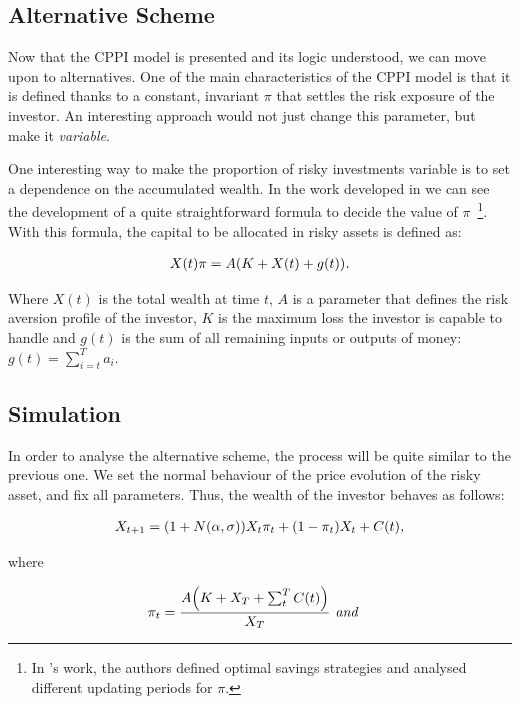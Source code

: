 \subsection{Alternative Scheme}

Now that the CPPI model is presented and its logic understood, we can move upon to alternatives. One of the main characteristics of the CPPI model is that it is defined thanks to a constant, invariant $\pi$ that settles the risk exposure of the investor. An interesting approach would not just change this parameter, but make it \emph{variable}.

One interesting way to make the proportion of risky investments variable is to set a dependence on the accumulated wealth. In the work developed in \cite{a:guillen-optimisation} we can see the development of a quite straightforward formula to decide the value of $\pi$~\footnote{In \cite{a:donnelly-savings-decisions}'s work, the authors defined optimal savings strategies and analysed different updating periods for $\pi$.}. With this formula, the capital to be allocated in risky assets is defined as:

\begin{align}
    X(t)\pi = A\qty(K + X(t) + g(t)) \textit{.}
\end{align}

Where $X(t)$ is the total wealth at time $t$, $A$ is a parameter that defines the risk aversion profile of the investor, $K$ is the maximum loss the investor is capable to handle and $g(t)$ is the sum of all remaining inputs or outputs of money: $g(t) = \sum_{i=t}^{T}a_i$.

\subsection*{Simulation}

In order to analyse the alternative scheme, the process will be quite similar to the previous one. We set the normal behaviour of the price evolution of the risky asset, and fix all parameters. Thus, the wealth of the investor behaves as follows:

\begin{align}
    X_{t+1} = \qty(1+N(\alpha, \sigma))X_t \pi_t + \qty(1 - \pi_t)X_t + C(t) \textit{,}
\end{align}

where

\begin{align}
    \pi_t = \frac{A\qty(K + X_T + \sum_t^T C(t))}{X_T} & \textit{                           and}
\end{align}

